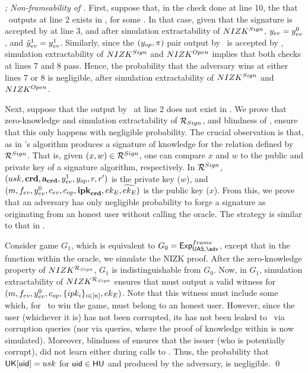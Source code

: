 \begin{proof}[; Non-frameability of \CUASGen]


  First, suppose that, in the check done at line 10, the \Sig that \adv~outputs
  at line 2 exists in \SIG, for some \uid. In that case, given that the
  signature is accepted by \Verify at
  line 3, and after simulation extractability of $NIZK^{Sign}$, $y_{ev} =
  y_{ev}^0$, and $\tilde{y}_{ev}^1 = y_{ev}^1$. Similarly, since the $(y_{op},\pi)$
  pair output by \adv~is accepted by \Judge, simulation extractability of
  $NIZK^{Sign}$ and $NIZK^{Open}$ implies that both checks at lines 7 and 8
  pass. Hence, the probability that the adversary wins at either lines 7 or 8 is
  negligible, after simulation extractability of $NIZK^{Sign}$ and
  $NIZK^{Open}$.

  Next, suppose that the \Sig output by \adv~at line 2 does not exist in \SIG.
  We prove that zero-knowledge and simulation extractability of
  $\mathcal{R}_{Sign}$, and blindness of \SBCM, ensure that this only happens with
  negligible probability.
  The crucial observation is that, as in \cite{cl06} \CUASGen's \Sign algorithm
  produces a signature of knowledge for the relation defined by
  $\mathcal{R}^{Sign}$. That is, given $(x,w) \in \mathcal{R}^{Sign}$, one can
  compare $x$ and $w$ to the public and private key of a signature algorithm,
  respectively. In $\mathcal{R}^{Sign}$, $(usk,\mathbf{crd},\mathbf{a}_{\mathbf{crd}},y_{ev}^1,
  y_{op},r,r')$ is the private key ($w$), and $(m,f_{ev},y_{ev}^0,c_{ev},
  c_{op},\mathbf{ipk}_{\mathbf{crd}},ek_{E},\widetilde{ek_{E}})$ is the public key ($x$).
  From this, we prove that an adversary has only negligible probability to forge
  a signature as originating from an honest user without calling the \SIGN
  oracle. The strategy is similar to that in \cite[Theorem 2.1]{cl06}.

  Consider game $G_1$, which is equivalent to $G_0 = \ExpNonframe$, except that
  in the \Sign function within the \SIGN oracle, we simulate the NIZK proof.
  After the zero-knowledge property of $NIZK^{\mathcal{R}_{Sign}}$, $G_1$ is
  indistinguishable from $G_0$. Now, in $G_1$, simulation extractability of
  $NIZK^{\mathcal{R}_{Sign}}$ ensures that \ExtractSign must output a valid
  witness for $(m,f_{ev},y_{ev}^0,c_{op},\lbrace ipk_i \rbrace_{i\in[n]},
  ek_{E})$. Note that this witness must include some \usk which,
  for \adv~to win the game, must belong to an honest user. However, since the
  user (whichever it is) has not been corrupted, its \usk has not been leaked
  to \adv~via corruption queries (nor via \SIGN queries, where the proof of
  knowledge within \Sign is now simulated). Moreover, blindness of \SBCM ensures
  that the issuer (who is potentially corrupt), did not learn \usk either during
  calls to \OBTAIN. Thus, the probability that $\mathsf{UK}[\mathsf{uid}] = usk$ for $\mathsf{uid} \in
  \mathsf{HU}$ and \Sig produced by the adversary, is negligible.
  \qed
\end{proof}


